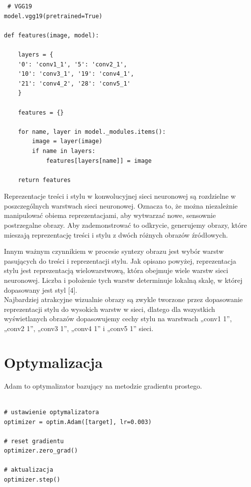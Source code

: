 \documentclass[openright]{xmgr}
\begin{document}
\begin{lstlisting}
 # VGG19
model.vgg19(pretrained=True) 
 
def features(image, model):

	layers = {
	'0': 'conv1_1', '5': 'conv2_1', 
	'10': 'conv3_1', '19': 'conv4_1', 
	'21': 'conv4_2', '28': 'conv5_1'
	}

	features = {}

	for name, layer in model._modules.items():
		image = layer(image)
		if name in layers:
			features[layers[name]] = image

	return features
\end{lstlisting}


Reprezentacje treści i stylu w konwolucyjnej sieci neuronowej są rozdzielne w poszczególnych warstwach sieci neuronowej. Oznacza to, że można niezależnie manipulować obiema reprezentacjami, aby wytwarzać nowe, sensownie postrzegalne obrazy. Aby zademonstrować to odkrycie, generujemy obrazy, które mieszają reprezentację treści i stylu z dwóch różnych obrazów źródłowych.

Innym ważnym czynnikiem w procesie syntezy obrazu jest wybór warstw pasujących do treści i reprezentacji stylu. Jak opisano powyżej, reprezentacja stylu jest reprezentacją wielowarstwową, która obejmuje wiele warstw sieci neuronowej. Liczba i położenie tych warstw determinuje lokalną skalę, w której dopasowany jest styl [4]. 
\\
 Najbardziej atrakcyjne wizualnie obrazy są zwykle tworzone przez dopasowanie reprezentacji stylu do wysokich warstw w sieci, dlatego dla wszystkich wyświetlanych obrazów dopasowujemy cechy stylu na warstwach „conv1 1”, „conv2 1”, „conv3 1”, „conv4 1” i „conv5 1” sieci.

\section{Optymalizacja\label{s:dsssl}}

\indent \indent Adam to optymalizator bazujący na metodzie gradientu prostego.

\begin{lstlisting}

# ustawienie optymalizatora
optimizer = optim.Adam([target], lr=0.003)
      
# reset gradientu
optimizer.zero_grad()
      
# aktualizacja
optimizer.step()

\end{lstlisting}
\end{document}
